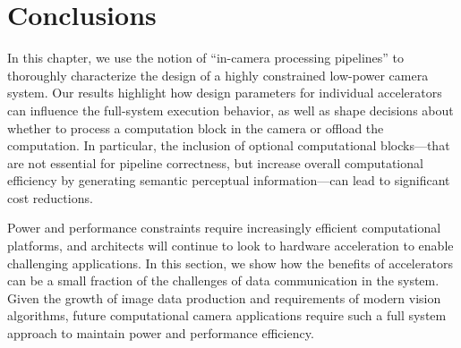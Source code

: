 


\section{Conclusions}
 \label{sec:nsp-conclusion}

In this chapter, we use the notion of ``in-camera processing pipelines'' to thoroughly characterize the design of a highly constrained low-power camera system.
Our results highlight how design parameters for individual accelerators can influence the full-system execution behavior, as well as shape decisions about whether to process a computation block in the camera or offload the computation.
In particular, the inclusion of optional computational blocks---that are not essential for pipeline correctness, but increase overall computational efficiency by generating semantic perceptual information---can lead to significant cost reductions.

Power and performance constraints require increasingly efficient computational platforms, and architects will continue to look to hardware acceleration to enable challenging applications.
In this section, we show how the benefits of accelerators can be a small fraction of the challenges of data communication in the system.
Given the growth of image data production and requirements of modern vision algorithms, future computational camera applications require such a full system approach to maintain power and performance efficiency.






